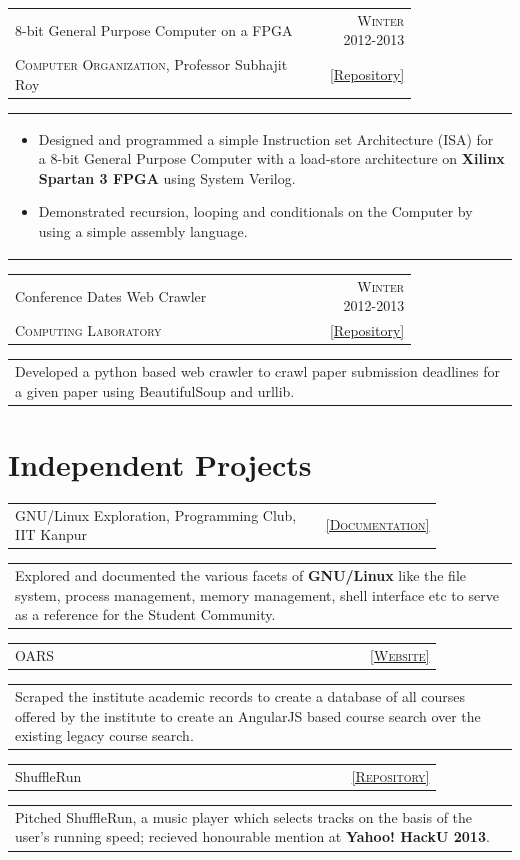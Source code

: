 \documentclass[a4paper,10pt]{article} %
\newcommand{\cproject}[5]{
    \begin{tabular}{p{0.80\linewidth}r}
        \textcolor{NavyBlue}{#2} & \multicolumn{1}{m{4cm}}{\raggedleft \textsc{#1}}\\
        #3 & #4
    \end{tabular}
    \begin{tabular}{p{\linewidth}}
    \vspace{-0.3cm}
        \footnotesize{#5}
    \end{tabular}
    \vspace{-0.5cm}
}
\newcommand{\scproject}[5]{
    \begin{tabular}{p{0.80\linewidth}r}
        \textcolor{NavyBlue}{#2} & \multicolumn{1}{m{4cm}}{\raggedleft \textsc{#1}}\\
        #3 & #4
    \end{tabular}
    \begin{tabular}{p{\linewidth}}
    \vspace{-0.3cm}
        \footnotesize{#5}
    \end{tabular}
    \vspace{-0.3cm}
}
\newcommand{\siproject}[3]{
    \begin{tabular}{p{0.85\linewidth}r}
        \textcolor{NavyBlue}{#2} & \multicolumn{1}{m{3cm}}{\raggedleft \textsc{#1}}\\
    \end{tabular}
    \begin{tabular}{p{\linewidth}}
    \vspace{-0.3cm}
        \footnotesize{#3}
    \end{tabular}
    \vspace{-0.3cm}
}
\begin{document}
\cproject
    {Winter 2012-2013}
    {8-bit General Purpose Computer on a FPGA}
    {\textsc{Computer Organization}, Professor Subhajit Roy}
    { \href{https://github.com/srijanshetty/220\_y11} {\footnotesize{[Repository]}} }
    {
      \begin{itemize}[leftmargin=0.5cm]
          \item Designed and programmed a simple Instruction set Architecture (ISA) for a 8-bit General Purpose Computer with a load-store
              architecture on \textbf{Xilinx Spartan 3 FPGA} using System Verilog.
          \item Demonstrated recursion, looping and conditionals on the Computer by using a simple assembly language.
      \end{itemize}
    }

\scproject
    {Winter 2012-2013}
    {Conference Dates Web Crawler}
    {\textsc{Computing Laboratory}}
    {\href{https://github.com/srijanshetty/crawler} {\footnotesize{ [Repository]}} }
    {
           Developed a python based web crawler to crawl paper submission deadlines for a given paper using BeautifulSoup and
           urllib.
    }

\section{Independent Projects}

\siproject
    {\href{https://docs.google.com/document/d/1ZHO9w36aoq3oaZBR4Um1AOmDfiTDAEgM6baQAu3icw4/edit?usp=sharing}{[Documentation]} }
    {GNU/Linux Exploration, Programming Club, IIT Kanpur}
    {
        Explored and documented the various facets of \textbf{GNU/Linux} like the file system,
      process management, memory management, shell interface etc to serve as a reference for the
      Student Community.
    }

\siproject
    {\href{https://navya.github.io/oars}{[Website]}}
    {OARS}
    { Scraped the institute academic records to create a database of all courses offered by the institute to create an AngularJS based course search over the existing legacy course search.  }

\siproject
    {\href{https://github.com/srijanshetty/ShuffleRun} {[Repository]}}
    {ShuffleRun}
    { Pitched ShuffleRun, a music player which selects tracks on the basis of the user's running speed; recieved honourable mention at \textbf{Yahoo! HackU 2013}. }
\end{document}

